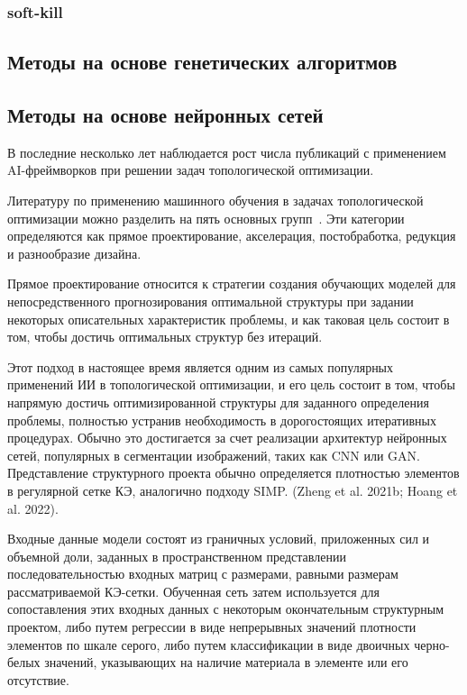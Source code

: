 \subsubsection{soft-kill}


\subsection{Методы на основе генетических алгоритмов}


\subsection{Методы на основе нейронных сетей}

В последние несколько лет наблюдается рост числа публикаций с применением AI-фреймворков при решении задач топологической оптимизации.

Литературу по применению машинного обучения в задачах топологической оптимизации можно разделить на пять основных групп~\cite{Woldseth2022}. Эти категории определяются как прямое проектирование, акселерация, постобработка, редукция и разнообразие дизайна. 





Прямое проектирование относится к стратегии создания обучающих моделей для непосредственного прогнозирования оптимальной структуры при задании некоторых описательных характеристик проблемы, и как таковая цель состоит в том, чтобы достичь оптимальных структур без итераций.

Этот подход в настоящее время является одним из самых популярных применений ИИ в топологической оптимизации, и его цель состоит в том, чтобы напрямую достичь оптимизированной структуры для заданного определения проблемы, полностью устранив необходимость в дорогостоящих итеративных процедурах. Обычно это достигается за счет реализации архитектур нейронных сетей, популярных в сегментации изображений, таких как CNN или GAN. Представление структурного проекта обычно определяется плотностью элементов в регулярной сетке КЭ, аналогично подходу SIMP. (Zheng et al. 2021b; Hoang et al. 2022).

Входные данные модели состоят из граничных условий, приложенных сил и объемной доли, заданных в пространственном представлении последовательностью входных матриц с размерами, равными размерам рассматриваемой КЭ-сетки. Обученная сеть затем используется для сопоставления этих входных данных с некоторым окончательным структурным проектом, либо путем регрессии в виде непрерывных значений плотности элементов по шкале серого, либо путем классификации в виде двоичных черно-белых значений, указывающих на наличие материала в элементе или его отсутствие. 


